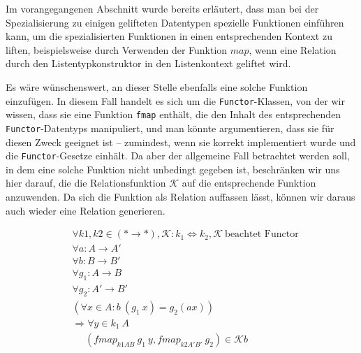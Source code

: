 Im vorangegangenen Abschnitt wurde bereits erläutert, dass man bei der Spezialisierung zu einigen gelifteten Datentypen
spezielle Funktionen einführen kann, um die spezialisierten Funktionen in einen entsprechenden Kontext zu liften, beispielsweise
durch Verwenden der Funktion $map$, wenn eine Relation durch den Listentypkonstruktor in den Listenkontext geliftet wird.

Es wäre wünschenswert, an dieser Stelle ebenfalls eine solche Funktion einzufügen. In diesem Fall handelt es sich um die
\texttt{Functor}-Klassen, von der wir wissen, dass sie eine Funktion \texttt{fmap} enthält, die den Inhalt des entsprechenden
\texttt{Functor}-Datentyps manipuliert, und man könnte argumentieren, dass sie für diesen Zweck geeignet ist -- zumindest, wenn sie
korrekt implementiert wurde und die \texttt{Functor}-Gesetze einhält. Da aber der allgemeine Fall betrachtet werden soll, in dem
eine solche Funktion nicht unbedingt gegeben ist, beschränken wir uns hier darauf, die
die Relationsfunktion $\mathcal{K}$ auf
die entsprechende Funktion anzuwenden. Da sich die Funktion als Relation auffassen lässt, können wir daraus auch wieder
eine Relation generieren.


%
\begin{align*}
&\forall k1, k2 \in (* \rightarrow *), \mathcal{K} : k_1 \Leftrightarrow k_2, \mathcal{K}~\text{beachtet Functor} \\
&\forall a : A \rightarrow A' \\
&\forall b : B \rightarrow B' \\
&\forall g_1 : A \rightarrow B\\
&\forall g_2 : A' \rightarrow B' \\
&(\forall x \in A : b\ (g_1\ x) = g_2 (a x))\\
&\Rightarrow \forall y \in k_1\ A\\
&\ \ \ \ \ \ (fmap_{k1 A B}\ g_1\ y, fmap_{k2 A' B'}\ g_2) \in \mathcal{K} b
\end{align*}

